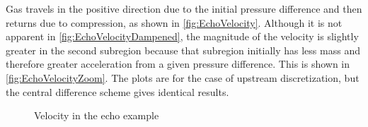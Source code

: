 Gas travels in the positive direction due to the initial pressure difference and then returns due to compression, as shown in \autoref{fig:EchoVelocity}.  Although it is not apparent in \autoref{fig:EchoVelocityDampened}, the magnitude of the velocity is slightly greater in the second subregion because that subregion initially has less mass and therefore greater acceleration from a given pressure difference.  This is shown in \autoref{fig:EchoVelocityZoom}.  The plots are for the case of upstream discretization, but the central difference scheme gives identical results.

\begin{figure}[htbp]
  \quad
  \caption{Velocity in the echo example}
  \label{fig:EchoVelocity}
\end{figure}


